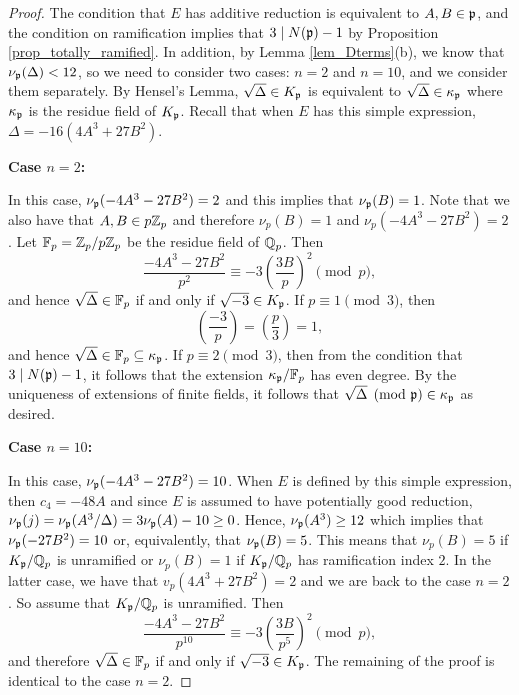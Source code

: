 \begin{proof}
    The condition that $E$ has additive reduction is equivalent to $A,B\in\mathfrak{p}$, and the condition on ramification implies that $3\mid N(\mathfrak{p})-1$ by Proposition \ref{prop_totally_ramified}. In addition, by Lemma \ref{lem_Dterms}(b), we know that $\nu_{\mathfrak{p}}(\Delta)<12$, so we need to consider two cases: $n=2$ and $n=10$, and we consider them separately. By Hensel's Lemma, $\sqrt{\Delta}\in K_{\mathfrak{p}}$ is equivalent to $\sqrt{\Delta}\in \kappa_{\mathfrak{p}}$ where $\kappa_{\mathfrak{p}}$ is the residue field of $K_{\mathfrak{p}}$. Recall that when $E$ has this simple expression, $\Delta=-16(4A^3+27B^2)$.


    \textbf{Case $n=2$:}

    In this case, $\nu_{\mathfrak{p}}(-4A^3-27B^2)=2$ and this implies that $\nu_{\mathfrak{p}}(B)=1$. Note that we also have that $A,B\in p\mathbb{Z}_p$ and therefore $\nu_p(B)=1$ and $\nu_p(-4A^3-27B^2)=2$. Let $\mathbb{F}_p=\mathbb{Z}_p/p\mathbb{Z}_p$ be the residue field of $\mathbb{Q}_p$. Then 
    $$\frac{-4A^3-27B^2}{p^2}\equiv -3\left(\frac{3B}{p}\right)^2\pmod{p},$$
    and hence $\sqrt{\Delta}\in\mathbb{F}_p$ if and only if $\sqrt{-3}\in K_{\mathfrak{p}}$. 
    If $p\equiv1\pmod{3}$, then
    $$\left(\frac{-3}{p}\right)=\left(\frac{p}{3}\right)=1,$$
    and hence $\sqrt{\Delta}\in \mathbb{F}_p\subseteq \kappa_{\mathfrak{p}}$. If $p\equiv 2\pmod{3}$, then from the condition that $3\mid N(\mathfrak{p})-1$, it follows that the extension $\kappa_{\mathfrak{p}}/\mathbb{F}_p$ has even degree. By the uniqueness of extensions of finite fields, it follows that $\sqrt{\Delta}\pmod{\mathfrak{p}}\in\kappa_{\mathfrak{p}}$ as desired.

    \textbf{Case $n=10$:} 

    In this case, $\nu_{\mathfrak{p}}(-4A^3-27B^2)=10$. When $E$ is defined by this simple expression, then $c_4=-48A$ and since $E$ is assumed to have potentially good reduction, $\nu_{\mathfrak{p}}(j)=\nu_{\mathfrak{p}}(A^3/\Delta)=3\nu_{\mathfrak{p}}(A)-10\geq 0$. Hence, $\nu_{\mathfrak{p}}(A^3)\geq12$ which implies that $\nu_{\mathfrak{p}}(-27B^2)=10$ or, equivalently, that $\nu_{\mathfrak{p}}(B)=5$. This means that $\nu_p(B)=5$ if $K_{\mathfrak{p}}/\mathbb{Q}_p$ is unramified or $\nu_p(B)=1$ if $K_{\mathfrak{p}}/\mathbb{Q}_p$ has ramification index $2$. In the latter case, we have that $v_p(4A^3+27B^2)=2$ and we are back to the case $n=2$. So assume that $K_{\mathfrak{p}}/\mathbb{Q}_p$ is unramified. Then
    $$\frac{-4A^3-27B^2}{p^{10}}\equiv -3\left(\frac{3B}{p^5}\right)^2\pmod{p},$$
    and therefore $\sqrt{\Delta}\in\mathbb{F}_p$ if and only if $\sqrt{-3}\in K_{\mathfrak{p}}$. The remaining of the proof is identical to the case $n=2$.

\end{proof}









